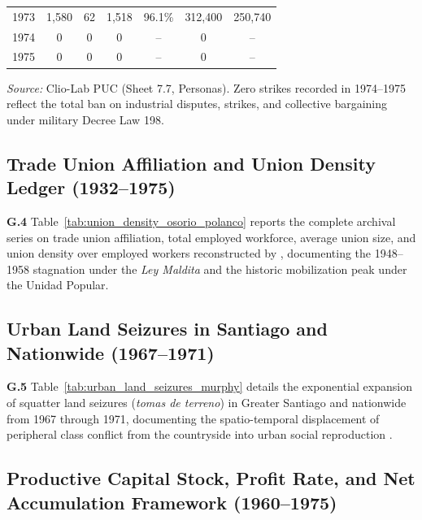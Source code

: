 \begin{table}[htbp]
\begin{tabular}{lcccccc}
1973 & 1,580 & 62 & 1,518 & 96.1\% & 312,400 & 250,740 \\
1974 & 0 & 0 & 0 & -- & 0 & -- \\
1975 & 0 & 0 & 0 & -- & 0 & -- \\
\bottomrule
\end{tabular}
\begin{minipage}{\textwidth}
\vspace{0.3em}
\footnotesize
\textit{Source:} Clio-Lab PUC (Sheet 7.7, Personas). Zero strikes recorded in 1974--1975 reflect the total ban on industrial disputes, strikes, and collective bargaining under military Decree Law 198.
\end{minipage}
\end{table}

\subsection{Trade Union Affiliation and Union Density Ledger (1932--1975)}
\label{app:union_density_ledger}

\textbf{G.4} Table~\ref{tab:union_density_osorio_polanco} reports the complete archival series on trade union affiliation, total employed workforce, average union size, and union density over employed workers reconstructed by \citet{OsorioPolanco2021}, documenting the 1948--1958 stagnation under the \textit{Ley Maldita} and the historic mobilization peak under the Unidad Popular.



\subsection{Urban Land Seizures in Santiago and Nationwide (1967--1971)}
\label{app:land_seizures_ledger}

\textbf{G.5} Table~\ref{tab:urban_land_seizures_murphy} details the exponential expansion of squatter land seizures (\textit{tomas de terreno}) in Greater Santiago and nationwide from 1967 through 1971, documenting the spatio-temporal displacement of peripheral class conflict from the countryside into urban social reproduction \citep{Murphy2015}.



\subsection{Productive Capital Stock, Profit Rate, and Net Accumulation Framework (1960--1975)}
\label{app:profit_accumulation_ledger}

